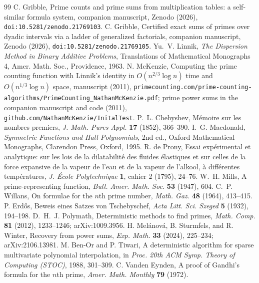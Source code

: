 \documentclass[11pt]{article}
\theoremstyle{remark}
\begin{document}
\begin{thebibliography}{99}
 C. Gribble, Prime counts and prime sums from multiplication tables: a
self-similar formula system, companion manuscript, Zenodo (2026), \texttt{doi:10.5281/zenodo.21769103}.
 C. Gribble, Certified exact sums of primes over dyadic intervals via a ladder
of generalized factorials, companion manuscript, Zenodo (2026), \texttt{doi:10.5281/zenodo.21769105}.
 Yu.~V. Linnik, \emph{The Dispersion Method in Binary Additive Problems},
Translations of Mathematical Monographs 4, Amer. Math. Soc., Providence, 1963.
 N. McKenzie, Computing the prime counting function with Linnik's identity in
$O(n^{2/3} \log n)$ time and $O(n^{1/3} \log n)$ space, manuscript (2011),
\texttt{primecounting.com/prime-counting-algorithms/}\allowbreak\texttt{PrimeCounting\_NathanMcKenzie.pdf}; prime power
sums in the companion manuscript and code (2011), \texttt{github.com/NathanMcKenzie/InitalTest}.
 P.~L. Chebyshev, M\'emoire sur les nombres premiers, \emph{J. Math. Pures Appl.}
\textbf{17} (1852), 366--390.
 I.~G. Macdonald, \emph{Symmetric Functions and Hall Polynomials}, 2nd ed.,
Oxford Mathematical Monographs, Clarendon Press, Oxford, 1995.
 R. de Prony, Essai exp\'erimental et analytique: sur les lois de la dilatabilit\'e
des fluides \'elastiques et sur celles de la force expansive de la vapeur de l'eau et de la vapeur de
l'alkool, \`a diff\'erentes temp\'eratures, \emph{J. \'Ecole Polytechnique} \textbf{1}, cahier 2
(1795), 24--76.
 W.~H. Mills, A prime-representing function, \emph{Bull. Amer. Math. Soc.} \textbf{53}
(1947), 604.
 C.~P. Willans, On formulae for the $n$th prime number, \emph{Math. Gaz.} \textbf{48}
(1964), 413--415.
 P. Erd\H{o}s, Beweis eines Satzes von Tschebyschef, \emph{Acta Litt. Sci. Szeged}
\textbf{5} (1932), 194--198.
 D.~H.~J. Polymath, Deterministic methods to find primes, \emph{Math. Comp.}
\textbf{81} (2012), 1233--1246; arXiv:1009.3956.
 H. Mel\'anov\'a, B. Sturmfels, and R. Winter, Recovery from power sums,
\emph{Exp. Math.} \textbf{33} (2024), 225--234; arXiv:2106.13981.
 M. Ben-Or and P. Tiwari, A deterministic algorithm for sparse multivariate polynomial
interpolation, in \emph{Proc. 20th ACM Symp. Theory of Computing (STOC)}, 1988, 301--309.
 C. Vanden Eynden, A proof of Gandhi's formula for the $n$th prime,
\emph{Amer. Math. Monthly} \textbf{79} (1972).

\end{thebibliography}
\end{document}
